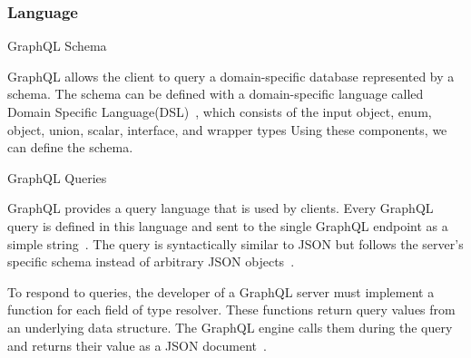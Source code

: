 \begin{frame}\frametitle{Language}

\begin{block}{GraphQL Schema}

GraphQL allows the client to query a domain-specific database represented by a schema. 
The schema can be defined with a domain-specific language called Domain Specific Language(DSL)~\cite{migrating-to-gql,gql-on-graph-db}, which consists of the input object, enum, object, union, scalar, interface, and wrapper types Using these components, we can define the schema.


\end{block}

\begin{block}{GraphQL Queries}


GraphQL provides a query language that is used by clients. 
Every GraphQL query is defined in this language and sent to 
the single GraphQL endpoint as a simple string~\cite{migrating-to-gql,real-time-sys-arc-based-on-gql}.
The query is syntactically similar to JSON but follows the server's specific schema instead of arbitrary JSON objects~\cite{gql-on-graph-db,initial-analysis-of-gql}. 


To respond to queries, the developer of a GraphQL server must implement a function for each field of type resolver. These functions return query values from an underlying data structure.  The GraphQL engine calls them during the query and returns their value as a JSON document~\cite{migrating-to-gql,real-time-sys-arc-based-on-gql}. 


\end{block}

\end{frame}

